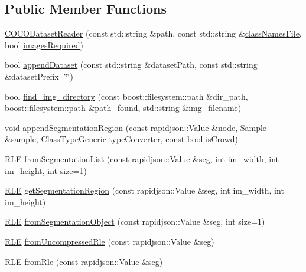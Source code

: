 \subsection*{Public Member Functions}
\begin{DoxyCompactItemize}
\item 
\hyperlink{class_c_o_c_o_dataset_reader_aeb5609c8496c92013c5e6d551696f3c8}{C\+O\+C\+O\+Dataset\+Reader} (const std\+::string \&path, const std\+::string \&\hyperlink{class_dataset_reader_a45ded43b56539f1e37a24ca9c94b4611}{class\+Names\+File}, bool \hyperlink{class_dataset_reader_a71d04d25d58e0e9a0c05d69afcff03a1}{images\+Required})
\item 
bool \hyperlink{class_c_o_c_o_dataset_reader_a0b7e394c98b512e387952c7f7e39823d}{append\+Dataset} (const std\+::string \&dataset\+Path, const std\+::string \&dataset\+Prefix=\char`\"{}\char`\"{})
\item 
bool \hyperlink{class_c_o_c_o_dataset_reader_a081c7b899608f70981075a37b291a221}{find\+\_\+img\+\_\+directory} (const boost\+::filesystem\+::path \&dir\+\_\+path, boost\+::filesystem\+::path \&path\+\_\+found, std\+::string \&img\+\_\+filename)
\item 
void \hyperlink{class_c_o_c_o_dataset_reader_a2e9d81e9fa12aa9d0e5df202f53792f0}{append\+Segmentation\+Region} (const rapidjson\+::\+Value \&node, \hyperlink{struct_sample}{Sample} \&sample, \hyperlink{struct_class_type_generic}{Class\+Type\+Generic} type\+Converter, const bool is\+Crowd)
\item 
\hyperlink{struct_r_l_e}{R\+LE} \hyperlink{class_c_o_c_o_dataset_reader_ac1529b3cc125da893d089fa88c866a53}{from\+Segmentation\+List} (const rapidjson\+::\+Value \&seg, int im\+\_\+width, int im\+\_\+height, int size=1)
\item 
\hyperlink{struct_r_l_e}{R\+LE} \hyperlink{class_c_o_c_o_dataset_reader_a2fcb9bb8c21783596a9c77efb49ca509}{get\+Segmentation\+Region} (const rapidjson\+::\+Value \&seg, int im\+\_\+width, int im\+\_\+height)
\item 
\hyperlink{struct_r_l_e}{R\+LE} \hyperlink{class_c_o_c_o_dataset_reader_a0133d6cd0659f32bb96c52e5afee33e6}{from\+Segmentation\+Object} (const rapidjson\+::\+Value \&seg, int size=1)
\item 
\hyperlink{struct_r_l_e}{R\+LE} \hyperlink{class_c_o_c_o_dataset_reader_ad3dc79ff171b5df8677a0a66a5f97ebd}{from\+Uncompressed\+Rle} (const rapidjson\+::\+Value \&seg)
\item 
\hyperlink{struct_r_l_e}{R\+LE} \hyperlink{class_c_o_c_o_dataset_reader_aa88f5bc653084dd529950558ebd6322c}{from\+Rle} (const rapidjson\+::\+Value \&seg)
\end{DoxyCompactItemize}
